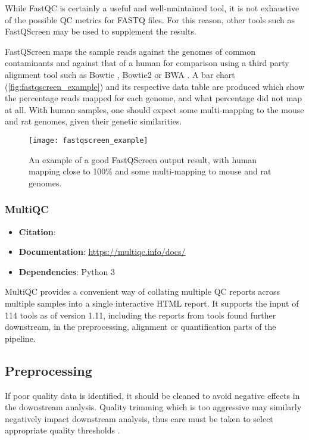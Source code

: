 While FastQC is certainly a useful and well-maintained tool, it is not exhaustive of the possible QC metrics for FASTQ files. For this reason, other tools such as FastQScreen may be used to supplement the results.

FastQScreen maps the sample reads against the genomes of common contaminants and against that of a human for comparison using a third party alignment tool such as Bowtie \citep{bowtie}, Bowtie2 \citep{bowtie2} or BWA \citep{bwa}. A bar chart (\autoref{fig:fastqscreen_example}) and its respective data table are produced which show the percentage reads mapped for each genome, and what percentage did not map at all. With human samples, one should expect some multi-mapping to the mouse and rat genomes, given their genetic similarities.

\begin{figure}[!ht]
    \centering
    \texttt{[image: fastqscreen\_example]}
    \caption[FastQScreen plot example]{An example of a good FastQScreen output result, with human mapping close to 100\% and some multi-mapping to mouse and rat genomes. } 
    \label{fig:fastqscreen_example}
\end{figure}
\clearpage

\subsubsection{MultiQC}

\begin{itemize}\itemsep-0.5em
\item[] \textbf{Citation}: 				\cite{multiqc}
\item[] \textbf{Documentation}: 	\url{https://multiqc.info/docs/}
\item[] \textbf{Dependencies}:  Python 3
\end{itemize}

MultiQC provides a convenient way of collating multiple QC reports across multiple samples into a single interactive HTML report. It supports the input of 114 tools as of version 1.11, including the reports from tools found further downstream, in the preprocessing, alignment or quantification parts of the pipeline. 

\subsection{Preprocessing}
If poor quality data is identified, it should be cleaned to avoid negative effects in the downstream analysis. Quality trimming which is too aggressive may similarly negatively impact downstream analysis, thus care must be taken to select appropriate quality thresholds \citep{davis2019}.

